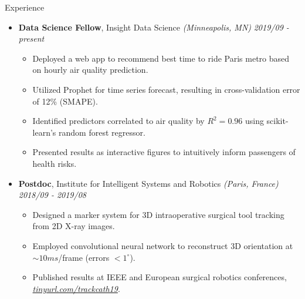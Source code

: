\documentclass{resume} %
\begin{document}
\begin{rSection}{Experience}
	
	\begin{itemize}
	\item {\bf Data Science Fellow}{, Insight Data Science \textit{(Minneapolis, MN)}} \hfill {\em 2019/09 - present}\\
	\vspace{-5mm}
	\begin{itemize}
		\setlength\itemsep{-1.75em}
		\item Deployed a web app to recommend best time to ride Paris metro based on hourly air quality prediction.\\
		\item Utilized Prophet for time series forecast, resulting in cross-validation error of 12\% (SMAPE).\\
		\item Identified predictors correlated to air quality by $R^2 = 0.96$ using scikit-learn's random forest regressor.\\
		\item Presented results as interactive figures to intuitively inform passengers of health risks.
	\end{itemize}	
	
	\item {\bf Postdoc}{, Institute for Intelligent Systems and Robotics \textit{(Paris, France)}} \hfill {\em 2018/09 - 2019/08}\\
	\vspace{-5mm}
	\begin{itemize}
		\setlength\itemsep{-1.75em}
		\item  Designed a marker system for 3D intraoperative surgical tool tracking from 2D X-ray images.\\ 
		\item  Employed convolutional neural network to reconstruct 3D orientation at $\sim 10 ms$/frame (errors $< 1 ^\circ$).\\
		\item  Published results at IEEE and European surgical robotics conferences, \textit{\href{tinyurl.com/trackcath19}{tinyurl.com/trackcath19}}.
	\end{itemize}
	

\end{itemize}
\end{rSection}
\end{document}
